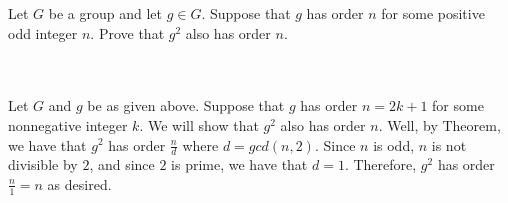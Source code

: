 Let $G$ be a group and let $g\in G$. Suppose that $g$ has order $n$ for some positive odd integer $n$.
Prove that $g^2$ also has order $n$.\\\\

\begin{solution}\renewcommand{\qedsymbol}{}\ \\
    Let $G$ and $g$ be as given above. Suppose that $g$ has order $n=2k+1$ for some nonnegative integer
    $k$. We will show that $g^2$ also has order $n$. Well, by Theorem, we have that $g^2$ has order
    $\frac{n}{d}$ where $d=gcd(n,2)$. Since $n$ is odd, $n$ is not divisible by $2$, and since $2$ is
    prime, we have that $d=1$. Therefore, $g^2$ has order $\frac{n}{1}=n$ as desired.

\end{solution}